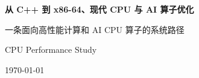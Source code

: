 \begin{titlepage}
  \centering
  \vspace*{3cm}

  {\bfseries 从 C++ 到 x86-64、现代 CPU 与 AI 算子优化\par}
  \vspace{1.2cm}
  { 一条面向高性能计算和 AI CPU 算子的系统路径\par}
  \vspace{2cm}
  { CPU Performance Study\par}
  \vfill
  {\large \today\par}
\end{titlepage}
